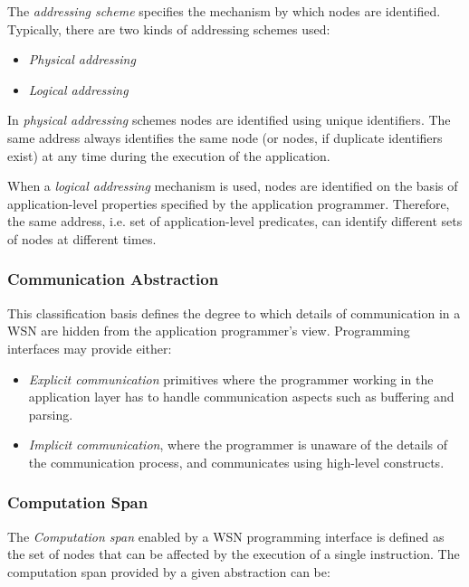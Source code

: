The \emph{addressing scheme} specifies the mechanism by which nodes are
identified. Typically, there are two kinds of addressing schemes used:

\begin{itemize}
  \item \emph{Physical addressing}
  \item \emph{Logical addressing}
\end{itemize}

In \emph{physical addressing} schemes nodes are identified using unique 
  identifiers. The same address always identifies the same node (or nodes, if
  duplicate  identifiers exist) at any time during the execution of the
  application.

When a \emph{logical addressing} mechanism is used, nodes are identified on the
basis of application-level properties specified by the application
programmer. Therefore, the same address, i.e. set of
application-level predicates, can identify different sets of nodes at different
times.

\subsubsection{Communication Abstraction}

This classification basis defines the degree to which details of communication
in a WSN are hidden from the application programmer's view. Programming
interfaces may provide either:

\begin{itemize}
  \item \emph{Explicit communication} primitives where the
  programmer working in the application layer has to handle communication
  aspects such as buffering and parsing.
  \item \emph{Implicit communication}, where the programmer is unaware of the
  details of the communication process, and communicates using
  high-level constructs.
\end{itemize}

\subsubsection{Computation Span}

The \emph{Computation span} enabled by a WSN programming interface is defined
as the set of nodes that can be affected by the execution of a single
instruction. The
computation span provided by a given abstraction can be:

